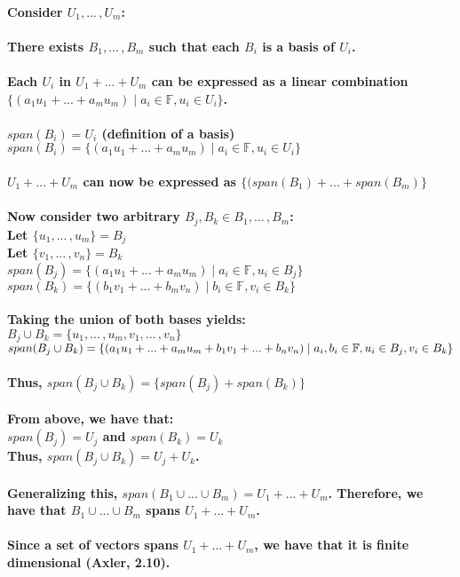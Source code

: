 \documentclass{article}
\begin{document}
\paragraph{\large
Consider $U_1,...\,,U_m$:
\\\\
There exists $B_1,...\,,B_m$ such that each $B_i$ is a basis of $U_i$.
\\\\
Each $U_i$ in $U_1+...+U_m$ can be expressed as a linear combination $\{(a_1u_1+...+a_mu_m)\;|\; a_i \in \mathbb{F}, u_i \in U_i\}$.
\\\\
$span(B_i) = U_i$ (definition of a basis)
\\ $span(B_i) = \{(a_1u_1+...+a_mu_m)\;|\; a_i \in \mathbb{F}, u_i \in U_i\}$
\\\\
$U_1+...+U_m$ can now be expressed as $\{(span(B_1)+...+span(B_m)\}$
\\\\
Now consider two arbitrary $B_j, B_k \in B_1,...\,,B_m$:
\\ Let $\{u_1,...\,,u_m\} = B_j$
\\ Let $\{v_1,...\,,v_n\} = B_k$
\\ $span(B_j) = \{(a_1u_1+...+a_mu_m)\;|\;a_i \in \mathbb{F}, u_i \in B_j\}$
\\ $span(B_k) = \{(b_1v_1+...+b_mv_n)\;|\;b_i \in \mathbb{F}, v_i \in B_k\}$
\\\\
Taking the union of both bases yields:
\\ $B_j \cup B_k = \{u_1,...\,,u_m, v_1,...\,,v_n\}$
\\ $span(B_j \cup B_k) = 
\\\{(a_1u_1+...+a_mu_m+b_1v_1+...+b_nv_n)\;|\;a_i,b_i \in \mathbb{F}, u_i \in B_j, v_i \in B_k\}$
\\\\
Thus, $span(B_j \cup B_k) = \{span(B_j) + span(B_k)\}$
\\\\
From above, we have that:
\\ $span(B_j) = U_j$ and $span(B_k) = U_k$
\\Thus, $span(B_j \cup B_k) = U_j + U_k$.
\\\\
Generalizing this, $span(B_1 \cup ... \cup B_m) = U_1+...+U_m$. Therefore, we have that $B_1 \cup ... \cup B_m$ spans $U_1+...+U_m$.}

\paragraph{\large
Since a set of vectors spans $U_1+...+U_m$, we have that it is finite dimensional (Axler, 2.10).}
\end{document}
